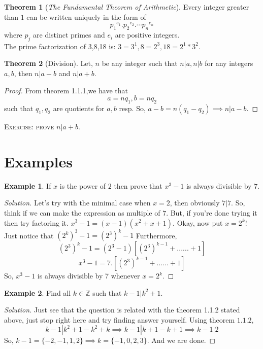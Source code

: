 \documentclass[a4paper,oneside,12 pt]{book}
\theoremstyle{definition}
\newtheorem{exmp}{Example}[section]
\theoremstyle{definition}
\theoremstyle{definition}
\newtheorem{theorem}{Theorem} [section]
\begin{document}
\begin{theorem} [\textit{The Fundamental Theorem of Arithmetic}]

Every integer greater than $1$ can be written uniquely in the form of $${p_1}^{e_1}.{p_2}^{e_2}.\cdots {p_n}^{e_n}$$ where $p_j$ are distinct primes and $e_i$ are positive integers.\\
\textsf{The prime factorization of 3,8,18 is: $3=3^1, 8=2^3, 18=2^1*3^2$. }

\end{theorem}

\begin{theorem} [Division]
Let, $n$ be any integer such that $n|a, n|b$ for any integers $a,b$, then $n|a-b$ and $n|a+b$.
\begin{proof}
From theorem 1.1.1,we have that 
$$a=nq_1, b=nq_2$$
such that $q_1,q_2$ are quotients for $a,b$ resp.
So, $a-b=n(q_1-q_2) \implies n|a-b$.

\end{proof}
\textsc{Exercise: prove $n|a+b$.}
\end{theorem}
 
\section{Examples}
\begin{exmp}
 If $x$ is the power of $2$ then prove that $x^3-1$ is always divisible by $7$.
\begin{proof}[Solution]
Let's try with the minimal case when $x=2$, then obviously $7|7$. So, think if we can make the expression as multiple of $7$.
But, if you're done trying it then try factoring it. $x^3-1=(x-1)(x^2+x+1)$.
 Okay, now put $x=2^k$! \\
Just notice that $(2^k)^3-1=(2^3)^k-1$
 Furthermore, $$(2^3)^k-1=(2^3-1)[(2^3)^{k-1}+......+1]$$
$$x^3-1=7.[(2^3)^{k-1}+......+1]$$
So, $x^3-1$ is always divisible by 7 whenever $x=2^k$.
\end{proof}
\end{exmp}

\begin{exmp}
Find all $k \in \mathbb{Z}$ such that $k-1|k^2+1$.
\begin{proof} [Solution]
Just see that the question is related with the theorem 1.1.2 stated above, just stop right here and try finding answer yourself.
Using theorem $1.1.2$,
$$k-1|k^2+1-k^2+k \implies k-1|k+1-k+1 \implies k-1|2$$
So, $k-1=\{-2,-1,1,2\} \implies k=\{-1,0,2,3\}$.
And we are done.
\end{proof}
\end{exmp}
\end{document}

